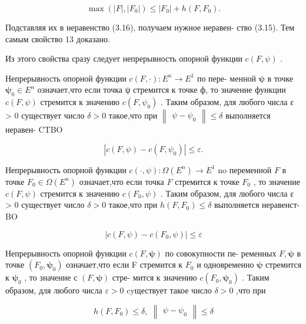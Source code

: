 \documentclass[8pt]{extarticle}
\begin{document}
\[
\max \left( {\left| F\right| ,\left| {F}_{0}\right| }\right)  \leq  \left| {F}_{0}\right|  + h\left( {F,{F}_{0}}\right) .
\]

Подставляя их в неравенство (3.16), получаем нужное неравен- ство (3.15). Тем самым свойство 13 доказано.

Из этого свойства сразу следует непрерывность опорной функции \(c\left( {F,\psi }\right)\) .

Непрерывность опорной функции \(c\left( {F, \cdot  }\right)  : {E}^{n} \rightarrow  {E}^{1}\) по пере- менной \(\mathbf{\psi }\) в точке \({\mathbf{\psi }}_{0} \in  {E}^{n}\) означает,что если точка ψ стремится к точке ф, то значение функции \(c\left( {F,\psi }\right)\) стремится к значению \(c\left( {F,{\psi }_{0}}\right)\) . Таким образом, для любого числа ε > 0 существует число \(\delta  > 0\) такое,что при \(\left\lVert \begin{array}{c} {\psi  - {\psi }_{0}} \end{array} \right\rVert \leq  \delta\) выполняется неравен- CTBO

\[
\left| {c\left( {F,\psi }\right)  - c\left( {F,{\psi }_{0}}\right) }\right|  \leq  \varepsilon .
\]

Непрерывность опорной функции \(c\left( {\cdot ,\psi }\right)  : \Omega \left( {E}^{n}\right)  \rightarrow  {E}^{1}\) no переменной \(F\) в точке \({F}_{0} \in  \Omega \left( {E}^{n}\right)\) означает,что если точка \(F\) стремится к точке \({F}_{0}\) , то значение \(c\left( {F,\psi }\right)\) стремится к значению \(c\left( {{F}_{0},\psi }\right)\) . Таким образом, для любого числа ε > 0 существует число \(\delta  > 0\) такое,что при \(h\left( {F,{F}_{0}}\right)  \leq  \delta\) выполняется неравенст- BO

\[
\left| {c\left( {F,\psi }\right)  - c\left( {{F}_{0},\psi }\right) }\right|  \leq  \varepsilon
\]

Непрерывность опорной функции \(c\left( {F,\mathbf{\psi }}\right)\) по совокупности пе- ременных \(F,\mathbf{\psi }\) в точке \(\left( {{F}_{0},{\mathbf{\psi }}_{0}}\right)\) означает,что если F стремится к \({F}_{0}\) и одновременно \(\mathbf{\psi }\) стремится к \({\mathbf{\psi }}_{0}\) , то значение с \(\left( {F,\mathbf{\psi }}\right)\) стре- мится к значению \(c\left( {{F}_{0},{\mathbf{\psi }}_{0}}\right)\) . Таким образом, для любого числа \(\varepsilon  > 0\) cyществует такое число \(\delta  > 0\) ,что при

\[
h\left( {F,{F}_{0}}\right)  \leq  \delta ,\;\left\lVert \begin{array}{c} {\psi  - {\psi }_{0}} \end{array} \right\rVert \leq  \delta
\]
\end{document}
